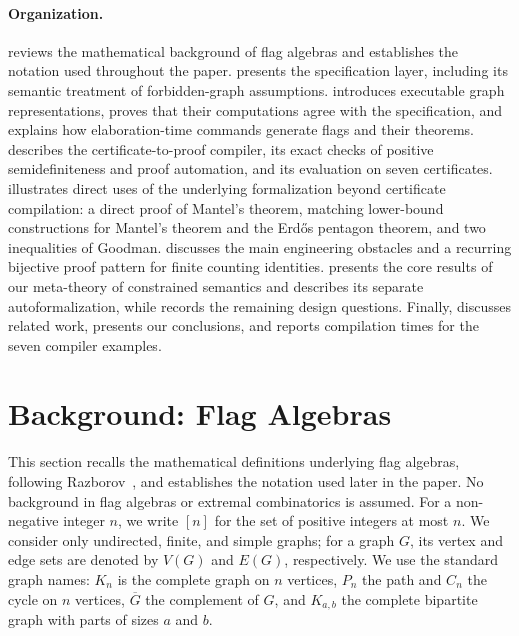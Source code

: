 \documentclass{article}
\begin{document}
\paragraph{Organization.}
 reviews the mathematical background of flag algebras and
establishes the notation used throughout the paper.  
presents the specification layer, including its semantic treatment of
forbidden-graph assumptions.   introduces executable
graph representations, proves that their computations agree with the
specification, and explains how elaboration-time commands generate flags and
their theorems.   describes the
certificate-to-proof compiler, its exact checks of positive semidefiniteness
and proof automation, and its evaluation on seven certificates.
 illustrates direct uses of the underlying formalization
beyond certificate compilation: a direct proof of Mantel's theorem, matching
lower-bound constructions for Mantel's theorem and the Erd\H{o}s pentagon
theorem, and two inequalities of Goodman.   discusses
the main engineering obstacles and a recurring bijective proof pattern for
finite counting identities.   presents the core results
of our meta-theory of constrained semantics and describes its separate
autoformalization, while
 records the remaining design questions.  Finally,
 discusses related work,  presents our
conclusions, and  reports compilation times for the seven
compiler examples.

\section{Background: Flag Algebras}
\label{sec:background}

This section recalls the mathematical definitions underlying flag algebras,
following Razborov~\cite{razborov2007flag}, and establishes the notation used
later in the paper.  No background in flag algebras or extremal combinatorics
is assumed.  For a non-negative integer $n$, we write $[n]$ for the set of
positive integers at most $n$.  We consider only undirected, finite, and simple
graphs; for a graph $G$, its vertex and edge sets are denoted by $V(G)$ and $E(G)$,
respectively.
We use the standard graph names: $K_n$ is the complete graph on $n$ vertices,
$P_n$ the path and $C_n$ the cycle on $n$ vertices, $\overline{G}$ the
complement of $G$, and $K_{a,b}$ the complete bipartite graph with parts of
sizes $a$ and $b$.
\end{document}
